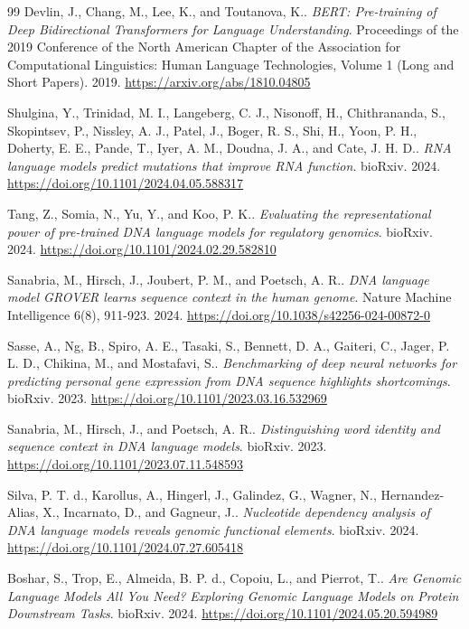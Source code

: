 \documentclass{ifacconf}
\begin{document}
\begin{thebibliography}{99}
Devlin, J., Chang, M., Lee, K., and Toutanova, K..
\textit{BERT: Pre-training of Deep Bidirectional Transformers for Language Understanding}.
Proceedings of the 2019 Conference of the North American Chapter of the Association for Computational Linguistics: Human Language Technologies, Volume 1 (Long and Short Papers). 2019.
\url{https://arxiv.org/abs/1810.04805}

Shulgina, Y., Trinidad, M. I., Langeberg, C. J., Nisonoff, H., Chithrananda, S., Skopintsev, P., Nissley, A. J., Patel, J., Boger, R. S., Shi, H., Yoon, P. H., Doherty, E. E., Pande, T., Iyer, A. M., Doudna, J. A., and Cate, J. H. D..
\textit{RNA language models predict mutations that improve RNA function}.
bioRxiv. 2024.
\url{https://doi.org/10.1101/2024.04.05.588317}

Tang, Z., Somia, N., Yu, Y., and Koo, P. K..
\textit{Evaluating the representational power of pre-trained DNA language models for regulatory genomics}.
bioRxiv. 2024.
\url{https://doi.org/10.1101/2024.02.29.582810}

Sanabria, M., Hirsch, J., Joubert, P. M., and Poetsch, A. R..
\textit{DNA language model GROVER learns sequence context in the human genome}.
Nature Machine Intelligence 6(8), 911-923. 2024.
\url{https://doi.org/10.1038/s42256-024-00872-0}

Sasse, A., Ng, B., Spiro, A. E., Tasaki, S., Bennett, D. A., Gaiteri, C., Jager, P. L. D., Chikina, M., and Mostafavi, S..
\textit{Benchmarking of deep neural networks for predicting personal gene expression from DNA sequence highlights shortcomings}.
bioRxiv. 2023.
\url{https://doi.org/10.1101/2023.03.16.532969}

Sanabria, M., Hirsch, J., and Poetsch, A. R..
\textit{Distinguishing word identity and sequence context in DNA language models}.
bioRxiv. 2023.
\url{https://doi.org/10.1101/2023.07.11.548593}

Silva, P. T. d., Karollus, A., Hingerl, J., Galindez, G., Wagner, N., Hernandez-Alias, X., Incarnato, D., and Gagneur, J..
\textit{Nucleotide dependency analysis of DNA language models reveals genomic functional elements}.
bioRxiv. 2024.
\url{https://doi.org/10.1101/2024.07.27.605418}

Boshar, S., Trop, E., Almeida, B. P. d., Copoiu, L., and Pierrot, T..
\textit{Are Genomic Language Models All You Need? Exploring Genomic Language Models on Protein Downstream Tasks}.
bioRxiv. 2024.
\url{https://doi.org/10.1101/2024.05.20.594989}


\end{thebibliography}
\end{document}
